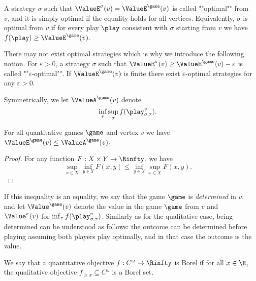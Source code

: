 A strategy $\sigma$ such that $\ValueE^\sigma(v) = \ValueE^{\game}(v)$ is called ""optimal"" from $v$,
and it is simply optimal if the equality holds for all vertices.
Equivalently, $\sigma$ is optimal from $v$ if for every play $\play$ consistent with $\sigma$ starting from $v$ 
we have $f(\play) \ge \ValueE^{\game}(v)$.

There may not exist optimal strategies which is why we introduce the following notion.
For $\varepsilon > 0$, a strategy $\sigma$ such that $\ValueE^\sigma(v) \ge \ValueE^{\game}(v) - \varepsilon$
is called ""$\varepsilon$-optimal"".
If $\ValueE^{\game}(v)$ is finite there exist $\varepsilon$-optimal strategies for any $\varepsilon > 0$.

Symmetrically, we let $\ValueA^{\game}(v)$ denote 
\[
\inf_{\tau} \sup_{\sigma} f(\play_{\sigma,\tau}^{v}).
\]
\begin{fact}
For all quantitative games $\game$ and vertex $v$ we have $\ValueE^{\game}(v) \le \ValueA^{\game}(v)$.
\end{fact}
\begin{proof}
For any function $F : X \times Y \to \Rinfty$, we have 
\[
\sup_{x \in X} \inf_{y \in Y} F(x,y) \le \inf_{y \in Y} \sup_{x \in X} F(x,y).
\]
\end{proof}

If this inequality is an equality, we say that the game $\game$ is \textit{determined} in $v$,
and let $\Value^{\game}(v)$ denote the value in the game $\game$ from $v$
and $\Value^\sigma(v)$ for $\inf_{\tau} f(\play_{\sigma,\tau}^{v})$.
Similarly as for the qualitative case, being determined can be understood as follows: the outcome can be determined before playing assuming both players play optimally, and in that case the outcome is the value.

We say that a quantitative objective $f : C^\omega \to \Rinfty$ is Borel if for all $x \in \R$,
the qualitative objective $f_{\ge x} \subseteq C^\omega$ is a Borel set.


